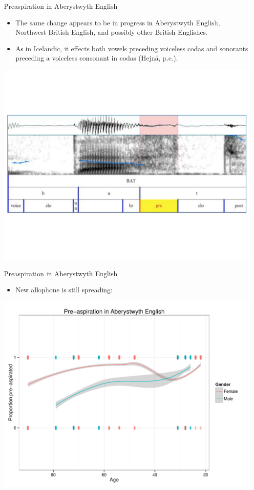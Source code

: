 \documentclass[hyperref={pdfpagelabels=false}]{beamer}
\begin{document}
\begin{frame}{Preaspiration in Aberystwyth English \citep{Hejna2014}}
\begin{itemize}
\item The same change appears to be in progress in Aberystwyth English, Northwest British English, and possibly other British Englishes.
\item As in Icelandic, it effects both vowels preceding voiceless codas and sonorants preceding a voiceless consonant in codas (Hejná, p.c.).
\end{itemize}
\begin{center}

\includegraphics[trim=2cm 2cm 2cm 5cm, clip=true, width=.85\textwidth]{PreaspEx.pdf}
\end{center}
\end{frame}

\begin{frame}{Preaspiration in Aberystwyth English \citep{Hejna2014}}
\begin{itemize}
\item New allophone is still spreading: \end{itemize}

\begin{center}
\includegraphics[width=.85\textwidth]{misaplot.pdf}
\end{center}
\end{frame}
\end{document}
